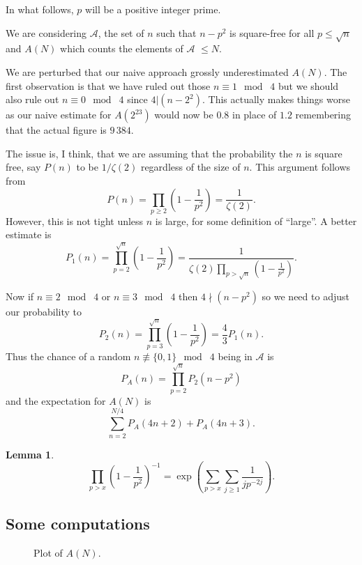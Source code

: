 \documentclass[leqno,a4paper]{article}
\newtheorem{lemma}{Lemma}[section]
\begin{document}
In what follows, $p$ will be a positive integer prime.

We are considering $\mathcal{A}$, the set of $n$ such that $n-p^2$ is square-free for all $p\leq\sqrt{n}$ and $A(N)$ which counts the elements of $\mathcal{A}$ $\leq N$.

We are perturbed that our naive approach grossly underestimated $A(N)$. The first observation is that we have ruled out those $n\equiv 1\mod\;4$ but we should also rule out $n\equiv 0\mod\;4$ since $4|(n-2^2)$. This actually makes things worse as our naive estimate for $A(2^{23})$ would now be $0.8$ in place of $1.2$ remembering that the actual figure is $9\,384$.

The issue is, I think, that we are assuming that the probability the $n$ is square free, say $P(n)$ to be $1/\zeta(2)$ regardless of the size of $n$. This argument follows from
$$
P(n)=\prod\limits_{p\geq 2}\left(1-\frac{1}{p^2}\right)=\frac{1}{\zeta(2)}.
$$
However, this is not tight unless $n$ is large, for some definition of ``large''. A better estimate is
$$
P_1(n)=\prod\limits_{p=2}^{\sqrt{n}}\left(1-\frac{1}{p^2}\right)=\frac{1}{\zeta(2)\prod\limits_{p>\sqrt{n}}\left(1-\frac{1}{p^2}\right)}.
$$

Now if $n\equiv 2\mod\;4$ or $n\equiv 3\mod\;4$ then $4\nmid(n-p^2)$ so we need to adjust our probability to
$$
P_2(n)=\prod\limits_{p=3}^{\sqrt{n}}\left(1-\frac{1}{p^2}\right)=\frac{4}{3}P_1(n).
$$
Thus the chance of a random $n\not\equiv \{0,1\}\mod\;4$ being in $\mathcal{A}$ is
$$
P_{A}(n)=\prod\limits_{p=2}^{\sqrt{n}}P_2(n-p^2)
$$
and the expectation for $A(N)$ is
$$
\sum\limits_{n=2}^{N/4} P_A(4n+2)+P_A(4n+3).
$$

\begin{lemma}

  $$
  \prod\limits_{p>x}\left(1-\frac{1}{p^2}\right)^{-1}=\exp\left(\sum\limits_{p>x}\sum\limits_{j\geq 1}\frac{1}{jp^{-2j}}\right).
  $$
  \end{lemma}

\subsection{Some computations}

\begin{figure}[tbp]
\centering
{}
\caption{Plot of $A(N)$.}
\end{figure}
\end{document}
